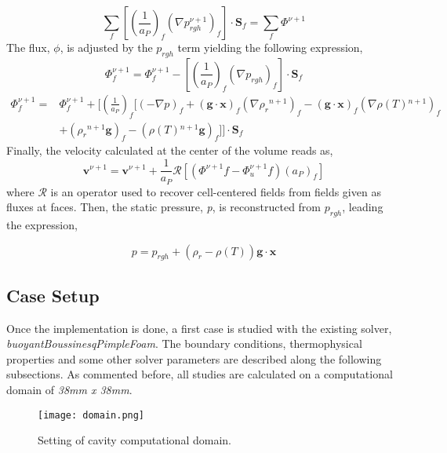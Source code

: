\begin{equation}
	\sum_{f}\left[\left(\frac{1}{a_{P}}\right)_{f}\left(\nabla p_{r g h}^{\nu+1}\right)_{f}\right] \cdot \textbf{S}_{f}=\sum_{f} \Phi^{\nu+1}
	\label{3.24}
\end{equation}
The flux, \textit{$\phi$}, is adjusted by the \textbf{$p_{rgh}$} term yielding the following expression,
\begin{equation}
	\Phi_{f}^{\nu+1}=\Phi_{f}^{\nu+1}-\left[\left(\frac{1}{a_{P}}\right)_{f}\left(\nabla p_{r g h}\right)_{f}\right] \cdot \textbf{S}_{f}
	\label{3.25}
\end{equation}
\begin{equation}
	\begin{aligned}
		\Phi_{f}^{\nu+1}=&\Phi_{f}^{\nu+1}+\biggl[\left(\frac{1}{a_{P}}\right)_{f}\biggl[(-\nabla p)_{f}+ (\textbf{g} \cdot \textbf{x})_{f}\left(\nabla \rho_{r}{ }^{n+1}\right)_{f}-(\textbf{g} \cdot \textbf{x})_{f}\left(\nabla \rho(T){ }^{n+1}\right)_{f}\\
		&+ (\rho_{r}{ }^{n+1} \textbf{g})_{f}-(\rho(T){ }^{n+1} \textbf{g})_{f} \biggr]\biggr] \cdot \textbf{S}_{f}
	\end{aligned}
	\label{3.26}
\end{equation}
Finally, the velocity calculated at the center of the volume reads as,
\begin{equation}
	\textbf{v}^{\nu+1}=\textbf{v}^{\nu+1} +\frac{1}{a_{P}}\mathcal{R}\left[\left(\Phi^{\nu+1} f-\Phi_{u}^{\nu+1} f\right)\left(a_{P}\right)_{f}\right]
	\label{3.27}
\end{equation}
where $\mathcal{R}$ is an operator used to recover cell-centered fields from fields given as fluxes at faces.
Then, the static pressure, \textit{p}, is reconstructed from \textit{$p_{rgh}$}, leading the expression,

\begin{equation}
	p = p_{r g h} + (\rho_{r}-\rho(T))\textbf{g}\cdot \textbf{x}
	\label{3.28}
\end{equation}
 
\subsection{Case Setup}

\setlength{\parindent}{0.5cm} Once the implementation is done, a first case is studied with the existing solver, \textit{buoyantBoussinesqPimpleFoam}. 
The boundary conditions, thermophysical properties and some other solver parameters are described along the following subsections.
\newline
As commented before, all studies are calculated on a computational domain of \textit{38mm x 38mm}. 
\begin{figure}[h]
	\label{3.4fig}	\centering	
	\texttt{[image: domain.png]}
	\caption{Setting of cavity computational domain.}
\end{figure} 

